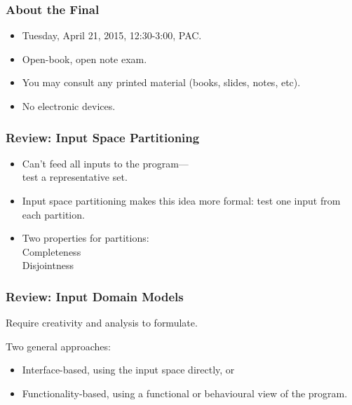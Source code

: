 \documentclass{beamer}
\newenvironment{changemargin}[1]{%
  \begin{list}{}{%
    \setlength{\topsep}{0pt}%
    \setlength{\leftmargin}{#1}%
    \setlength{\rightmargin}{1em}
    \setlength{\listparindent}{\parindent}%
    \setlength{\itemindent}{\parindent}%
    \setlength{\parsep}{\parskip}%
  }%
  \item[]}{\end{list}}
\begin{document}
\begin{frame}
  \frametitle{About the Final}
  \Large
  \begin{changemargin}{1.5cm}
\begin{itemize}
\item Tuesday, April 21, 2015, 12:30-3:00, PAC.
\item Open-book, open note exam.
\item You may consult any printed material
(books, slides, notes, etc).
\item No electronic devices.
\end{itemize}
  \end{changemargin}
\end{frame}

\begin{frame}
  \frametitle{Review: Input Space Partitioning}
  \large
  \begin{changemargin}{2cm}
\begin{itemize}
\item Can't feed all inputs to the program---\\ test a representative set.
\item Input space partitioning makes this idea more
formal: test one input from each partition.
\item Two properties for partitions:\\

\hspace*{1cm} Completeness\\
\hspace*{1cm} Disjointness
\end{itemize}
  \end{changemargin}
\end{frame}

\begin{frame}
  \frametitle{Review: Input Domain Models}
  \Large
  \begin{changemargin}{1.7cm}
Require creativity and
analysis to formulate.

Two general approaches:
\begin{itemize}
\item Interface-based, using the input space directly, or
\item Functionality-based, using a functional or behavioural
view of the program.
\end{itemize}
  \end{changemargin}
\end{frame}
\end{document}
